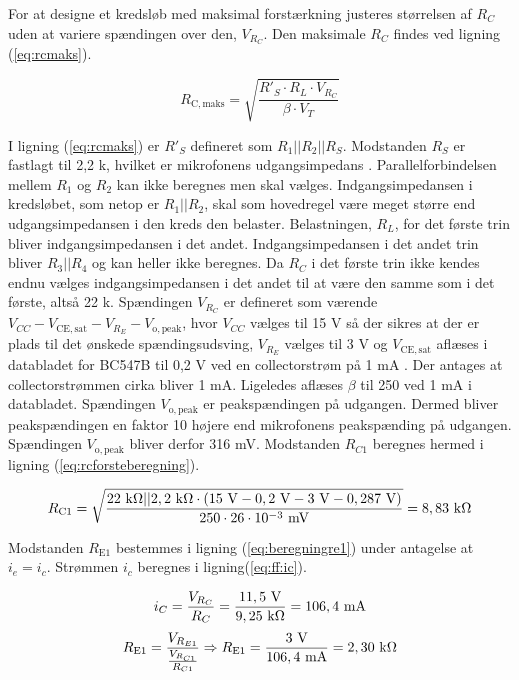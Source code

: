 For at designe et kredsløb med maksimal forstærkning justeres størrelsen af $R_C$ uden at variere spændingen over den, $V_{R_C}$. Den maksimale $R_C$ findes ved ligning (\ref{eq:rcmaks}).

\begin{equation}
R_{\mathrm{C,maks}} = \sqrt{\frac{R'_S \cdot R_L \cdot V_{R_C}}{\beta \cdot V_T}}
\label{eq:rcmaks}
\end{equation}

I ligning (\ref{eq:rcmaks}) er $R'_S$ defineret som $R_1||R_2||R_S$. Modstanden $R_S$ er fastlagt til 2,2 k\ohm, hvilket er mikrofonens udgangsimpedans \cite{mic-datablad}. Parallelforbindelsen mellem $R_1$ og $R_2$ kan ikke beregnes men skal vælges. Indgangsimpedansen i kredsløbet, som netop er $R_1||R_2$, skal som hovedregel være meget større end udgangsimpedansen i den kreds den belaster. Belastningen, $R_L$, for det første trin bliver indgangsimpedansen i det andet. Indgangsimpedansen i det andet trin bliver $R_3||R_4$ og kan heller ikke beregnes. Da $R_C$ i det første trin ikke kendes endnu vælges indgangsimpedansen i det andet til at være den samme som i det første, altså 22 k\ohm. 
Spændingen $V_{R_C}$ er defineret som værende $V_{CC} - V_{\mathrm{CE,sat}} - V_{R_E} - V_{\mathrm{o,peak}}$, hvor $V_{CC}$ vælges til 15 V så der sikres at der er plads til det ønskede spændingsudsving, $V_{R_E}$ vælges til 3 V og $V_{\mathrm{CE,sat}}$ aflæses i databladet for BC547B  til 0,2 V ved en collectorstrøm på 1 mA \cite{bc547b-datablad}. Der antages at collectorstrømmen cirka bliver 1 mA. Ligeledes aflæses $\beta$ til 250 ved 1 mA i databladet. Spændingen $V_{\mathrm{o,peak}}$ er peakspændingen på udgangen. Dermed bliver peakspændingen en faktor 10 højere end mikrofonens peakspænding på udgangen. Spændingen $V_{\mathrm{o,peak}}$ bliver derfor 316 mV. Modstanden $R_{C1}$ beregnes hermed i ligning (\ref{eq:rcforsteberegning}).

\begin{equation}
R_{\mathrm{C1}} = \sqrt{\frac{22~\mathrm{k}\ohm || 2,2~\mathrm{k}\ohm \cdot (15~\mathrm{V} - 0,2~\mathrm{V} - 3~\mathrm{V} - 0,287~\mathrm{V})}{250 \cdot 26 \cdot 10^{-3}~\mathrm{mV}}}=8,83~\mathrm{k}\ohm
\label{eq:rcforsteberegning}
\end{equation}

Modstanden $R_{\mathrm{E1}}$ bestemmes i ligning (\ref{eq:beregningre1}) under antagelse at $i_e = i_c$.  Strømmen $i_c$ beregnes i ligning(\ref{eq:ff:ic}).

\begin{equation}
\label{eq:ff:ic}
i_C=\frac{V_{R_C}}{R_C}=\frac{11,5~\mathrm{V}}{9,25~\mathrm{k}\ohm}=106,4~\mathrm{mA}
\end{equation}
\begin{equation}
R_{\mathrm{E1}}=\frac{V_{R_{E1}}}{\frac{V_{R_{C1}}}{R_{C1}}}  \Rightarrow R_{\mathrm{E1}}=\frac{3~\mathrm{V}}{106,4~\mathrm{mA}}=2,30~\mathrm{k}\ohm
\label{eq:beregningre1}
\end{equation}


